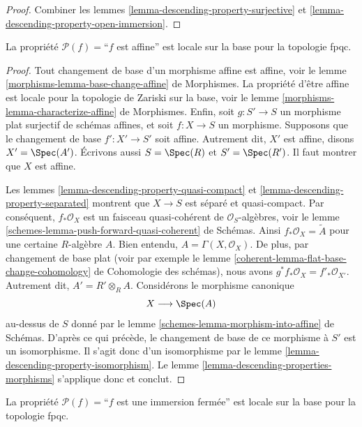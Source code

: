 \begin{proof}
Combiner les lemmes \ref{lemma-descending-property-surjective}
et \ref{lemma-descending-property-open-immersion}.
\end{proof}

\begin{lemma}
\label{lemma-descending-property-affine}
La propriété $\mathcal{P}(f) =$``$f$ est affine''
est locale sur la base pour la topologie fpqc.
\end{lemma}

\begin{proof}
Tout changement de base d'un morphisme affine est affine, voir
le lemme \ref{morphisms-lemma-base-change-affine} de Morphismes.
La propriété d'être affine est locale pour la topologie de Zariski sur la base,
voir le lemme \ref{morphisms-lemma-characterize-affine} de Morphismes.
Enfin, soit
$g : S' \to S$ un morphisme plat surjectif de schémas affines,
et soit $f : X \to S$ un morphisme. Supposons que le changement de base
$f' : X' \to S'$ soit affine. Autrement dit, $X'$ est affine, disons
$X' = \Spec(A')$. Écrivons aussi $S = \Spec(R)$
et $S' = \Spec(R')$. Il faut montrer que $X$ est affine.

\medskip\noindent
Les lemmes \ref{lemma-descending-property-quasi-compact}
et \ref{lemma-descending-property-separated} montrent que
$X \to S$ est séparé et quasi-compact. Par conséquent,
$f_*\mathcal{O}_X$ est un faisceau quasi-cohérent de $\mathcal{O}_S$-algèbres,
voir le lemme \ref{schemes-lemma-push-forward-quasi-coherent} de Schémas.
Ainsi $f_*\mathcal{O}_X = \widetilde{A}$ pour une certaine $R$-algèbre $A$.
Bien entendu, $A = \Gamma(X, \mathcal{O}_X)$.
De plus, par changement de base plat
(voir par exemple le lemme
\ref{coherent-lemma-flat-base-change-cohomology} de Cohomologie des schémas),
nous avons $g^*f_*\mathcal{O}_X = f'_*\mathcal{O}_{X'}$.
Autrement dit, $A' = R' \otimes_R A$.
Considérons le morphisme canonique
$$
X \longrightarrow \Spec(A)
$$
au-dessus de $S$ donné par le lemme
\ref{schemes-lemma-morphism-into-affine} de Schémas.
D'après ce qui précède, le changement de base de ce morphisme à $S'$ est un
isomorphisme. Il s'agit donc d'un isomorphisme par le
lemme \ref{lemma-descending-property-isomorphism}.
Le lemme \ref{lemma-descending-properties-morphisms} s'applique donc et conclut.
\end{proof}

\begin{lemma}
\label{lemma-descending-property-closed-immersion}
La propriété $\mathcal{P}(f) =$``$f$ est une immersion fermée''
est locale sur la base pour la topologie fpqc.
\end{lemma}

